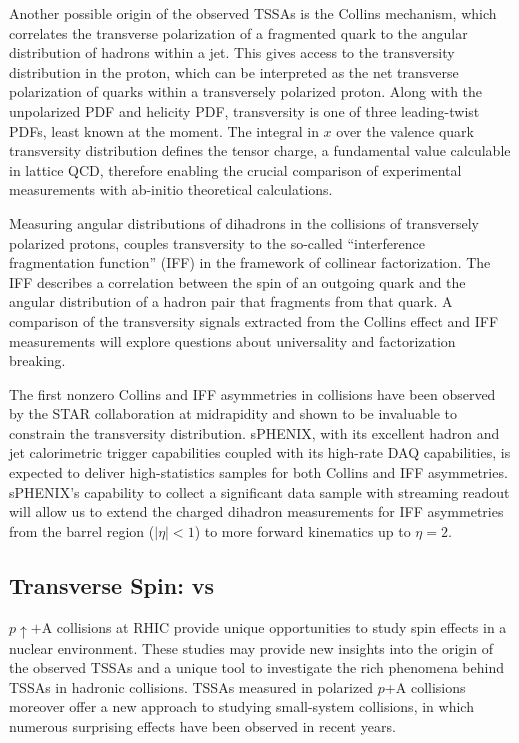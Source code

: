 Another possible origin of the observed TSSAs is the Collins mechanism, which correlates the transverse polarization of a fragmented quark to the angular distribution of hadrons within a jet. This gives access to the transversity distribution in the proton, which can be interpreted as the net transverse polarization of quarks within a transversely polarized proton. Along with the unpolarized PDF and helicity PDF, transversity is one of three leading-twist PDFs, least known at the moment. The integral in $x$ over the valence quark transversity distribution defines the tensor charge, a fundamental value calculable in lattice QCD, therefore enabling the crucial comparison of experimental measurements with ab-initio theoretical calculations.

Measuring angular distributions of dihadrons in the collisions of
transversely polarized protons, couples transversity to the so-called
``interference fragmentation function'' (IFF) in the framework of
collinear factorization. The IFF describes a correlation between the
spin of an outgoing quark and the angular distribution of a hadron
pair that fragments from that quark.  A comparison of the transversity
signals extracted from the Collins effect and IFF measurements will
explore questions about universality and factorization breaking. 

The first nonzero Collins and IFF asymmetries in \pp collisions have
been observed by the STAR collaboration at midrapidity and shown to be
invaluable to constrain the transversity distribution. sPHENIX, with
its excellent hadron and jet calorimetric trigger capabilities coupled
with its high-rate DAQ capabilities, is expected to deliver
high-statistics samples for both Collins and IFF
asymmetries. sPHENIX's capability to collect a significant 
data sample with streaming readout will allow us to extend the charged
dihadron measurements for IFF asymmetries from the barrel region
($|\eta|<1$) to more forward kinematics up to $\eta=2$.  


\subsection {Transverse Spin: \pp vs \pA}

$p\uparrow$$+$A collisions at RHIC provide unique opportunities to
study spin effects in a nuclear environment. These studies may provide
new insights into the origin of the observed TSSAs and a unique tool
to investigate the rich phenomena behind TSSAs in hadronic
collisions. TSSAs measured in polarized $p$+A collisions moreover
offer a new approach to studying small-system collisions, in which
numerous surprising effects have been observed in recent years. 

